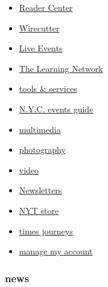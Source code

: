 \begin{itemize}
\tightlist
\item
  \href{https://web.archive.org/web/20200128165017/https://www.nytimes.com/section/reader-center}{Reader
  Center}
\item
  \href{https://web.archive.org/web/20200128165017/https://thewirecutter.com/}{Wirecutter}
\item
  \href{https://web.archive.org/web/20200128165017/http://nytconferences.com/}{Live
  Events}
\item
  \href{https://web.archive.org/web/20200128165017/https://www.nytimes.com/section/learning}{The
  Learning Network}
\item
  \href{https://web.archive.org/web/20200128165017/http://www.nytimes.com/marketing/tools-and-services}{tools
  \& services}
\item
  \href{https://web.archive.org/web/20200128165017/https://www.nytimes.com/spotlight/arts-listings}{N.Y.C.
  events guide}
\item
  \href{https://web.archive.org/web/20200128165017/https://www.nytimes.com/section/multimedia}{multimedia}
\item
  \href{https://web.archive.org/web/20200128165017/https://www.nytimes.com/section/lens}{photography}
\item
  \href{https://web.archive.org/web/20200128165017/https://www.nytimes.com/video}{video}
\item
  \href{https://web.archive.org/web/20200128165017/https://www.nytimes.com/newsletters}{Newsletters}
\item
  \href{https://web.archive.org/web/20200128165017/https://store.nytimes.com/}{NYT
  store}
\item
  \href{https://web.archive.org/web/20200128165017/https://www.nytimes.com/times-journeys}{times
  journeys}
\item
  \href{https://web.archive.org/web/20200128165017/https://account.nytimes.com/}{manage
  my account}
\end{itemize}

\hypertarget{news}{%
\subsubsection{news}\label{news}}

